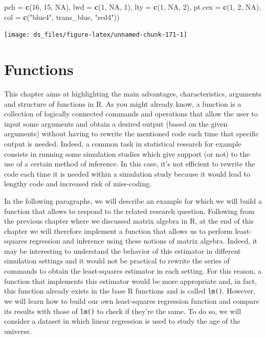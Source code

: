 \documentclass[12pt,]{krantz}
\newenvironment{Shaded}{\begin{snugshade}}{\end{snugshade}}
\newcommand{\KeywordTok}[1]{\textcolor[rgb]{0.27,0.27,0.27}{\textbf{#1}}}
\newcommand{\DataTypeTok}[1]{\textcolor[rgb]{0.27,0.27,0.27}{#1}}
\newcommand{\DecValTok}[1]{\textcolor[rgb]{0.06,0.06,0.06}{#1}}
\newcommand{\StringTok}[1]{\textcolor[rgb]{0.5,0.5,0.5}{#1}}
\newcommand{\OtherTok}[1]{\textcolor[rgb]{0.37,0.37,0.37}{#1}}
\newcommand{\NormalTok}[1]{#1}
\begin{document}
\begin{Shaded}
\begin{Highlighting}[]
       \DataTypeTok{pch =} \KeywordTok{c}\NormalTok{(}\DecValTok{16}\NormalTok{, }\DecValTok{15}\NormalTok{, }\OtherTok{NA}\NormalTok{), }\DataTypeTok{lwd =} \KeywordTok{c}\NormalTok{(}\DecValTok{1}\NormalTok{, }\OtherTok{NA}\NormalTok{, }\DecValTok{1}\NormalTok{), }\DataTypeTok{lty =} \KeywordTok{c}\NormalTok{(}\DecValTok{1}\NormalTok{, }\OtherTok{NA}\NormalTok{, }\DecValTok{2}\NormalTok{), }
       \DataTypeTok{pt.cex =} \KeywordTok{c}\NormalTok{(}\DecValTok{1}\NormalTok{, }\DecValTok{2}\NormalTok{, }\OtherTok{NA}\NormalTok{), }\DataTypeTok{col =} \KeywordTok{c}\NormalTok{(}\StringTok{"blue4"}\NormalTok{, trans_blue, }\StringTok{"red4"}\NormalTok{))}
\end{Highlighting}
\end{Shaded}

\begin{center}\texttt{[image: ds\_files/figure-latex/unnamed-chunk-171-1]} \end{center}

\chapter{Functions}\label{functions}

This chapter aims at highlighting the main advantages, characteristics,
arguments and structure of functions in R. As you might already know, a
function is a collection of logically connected commands and operations
that allow the user to input some arguments and obtain a desired output
(based on the given arguments) without having to rewrite the mentioned
code each time that specific output is needed. Indeed, a common task in
statistical research for example consists in running some simulation
studies which give support (or not) to the use of a certain method of
inference. In this case, it's not efficient to rewrite the code each
time it is needed within a simulation study because it would lead to
lengthy code and increased risk of miss-coding.

In the following paragraphs, we will describe an example for which we
will build a function that allows to respond to the related research
question. Following from the previous chapter where we discussed matrix
algebra in R, at the end of this chapter we will therefore implement a
function that allows us to perform least-squares regression and
inference using these notions of matrix algebra. Indeed, it may be
interesting to understand the behavior of this estimator in different
simulation settings and it would not be practical to rewrite the series
of commands to obtain the least-squares estimator in each setting. For
this reason, a function that implements this estimator would be more
appropriate and, in fact, this function already exists in the base R
functions and is called \texttt{lm()}. However, we will learn how to
build our own least-squares regression function and compare its results
with those of \texttt{lm()} to check if they're the same. To do so, we
will consider a dataset in which linear regression is used to study the
age of the universe.
\end{document}
